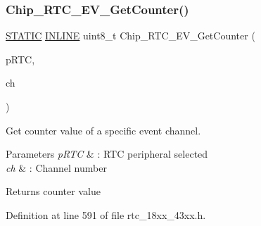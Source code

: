 \subsubsection{\texorpdfstring{Chip\+\_\+\+R\+T\+C\+\_\+\+E\+V\+\_\+\+Get\+Counter()}{Chip\_RTC\_EV\_GetCounter()}}
{\footnotesize\ttfamily \hyperlink{group___l_p_c___types___public___macros_ga10b2d890d871e1489bb02b7e70d9bdfb}{S\+T\+A\+T\+IC} \hyperlink{spifi__18xx__43xx_8h_a2eb6f9e0395b47b8d5e3eeae4fe0c116}{I\+N\+L\+I\+NE} uint8\+\_\+t Chip\+\_\+\+R\+T\+C\+\_\+\+E\+V\+\_\+\+Get\+Counter (\begin{DoxyParamCaption}\item[{\hyperlink{struct_l_p_c___r_t_c___t}{L\+P\+C\+\_\+\+R\+T\+C\+\_\+T} $\ast$}]{p\+R\+TC,  }\item[{\hyperlink{group___r_t_c__18_x_x__43_x_x_gaac7e8d7c66860037449fdde1bdfb657b}{R\+T\+C\+\_\+\+E\+V\+\_\+\+C\+H\+A\+N\+N\+E\+L\+\_\+T}}]{ch }\end{DoxyParamCaption})}



Get counter value of a specific event channel. 


\begin{DoxyParams}{Parameters}
{\em p\+R\+TC} & \+: R\+TC peripheral selected \\
\hline
{\em ch} & \+: Channel number \\
\hline
\end{DoxyParams}
\begin{DoxyReturn}{Returns}
counter value 
\end{DoxyReturn}


Definition at line 591 of file rtc\+\_\+18xx\+\_\+43xx.\+h.

\mbox{\label{group___r_t_c__18_x_x__43_x_x_ga7e3af0c85e9683474f034b2e370181ef}} 
